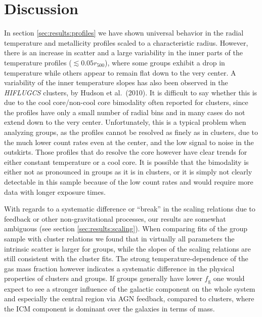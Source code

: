 \documentclass[structabstract]{aa}
\begin{document}
\section{Discussion}\label{sec:discussion}
In section \ref{sec:results:profiles} we have shown universal behavior
in the radial temperature and metallicity profiles scaled to a
characteristic radius. However, there is an increase in scatter and a
large variability in the inner parts of the temperature profiles
($\lesssim 0.05 r_{500}$), where some groups exhibit a drop in
temperature while others appear to remain flat down to the very
center. A variability of the inner temperature slopes has also
  been observed in the \emph{HIFLUGCS} clusters, by Hudson et al.\
  (2010). It is difficult to say whether this is due to the cool
  core/non-cool core bimodality often reported for clusters, since the
  profiles have only a small number of radial bins and in many cases
  do not extend down to the very center. Unfortunately, this is a
  typical problem when analyzing groups, as the profiles cannot be
  resolved as finely as in clusters, due to the much lower count rates
  even at the center, and the low signal to noise in the
  outskirts. Those profiles that do resolve the core however have
  clear trends for either constant temperature or a cool core. It is
  possible that the bimodality is either not as pronounced in groups
  as it is in clusters, or it is simply not clearly detectable in this
  sample because of the low count rates and would require more data
  with longer exposure times.

With regards to a systematic difference or ``break'' in the scaling
relations due to feedback or other non-gravitational processes, our
results are somewhat ambiguous (see section
\ref{sec:results:scaling}). When comparing fits of the group sample
with cluster relations we found that in virtually all parameters
  the intrinsic scatter is larger for groups, while the slopes of the
  scaling relations are still consistent with the cluster fits. The
  strong temperature-dependence of the gas mass fraction however
  indicates a systematic difference in the physical
  properties of clusters and groups. If groups generally have lower
  $f_{\text{g}}$ one would expect to see a stronger influence of
  the galactic component on the whole system and especially the
  central region via AGN feedback, compared to clusters, where the ICM
  component is dominant over the galaxies in terms of mass. 
\end{document}
